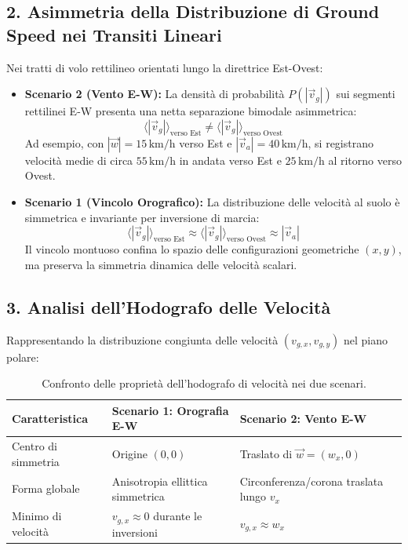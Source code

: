\documentclass[11pt,a4paper]{article}
\begin{document}
\subsection{2. Asimmetria della Distribuzione di Ground Speed nei Transiti Lineari}
Nei tratti di volo rettilineo orientati lungo la direttrice Est-Ovest:
\begin{itemize}
    \item \textbf{Scenario 2 (Vento E-W):} La densit\`a di probabilit\`a $P(|\vec{v}_g|)$ sui segmenti rettilinei E-W presenta una netta separazione bimodale asimmetrica:
    \begin{equation}
        \langle |\vec{v}_g| \rangle_{\text{verso Est}} \neq \langle |\vec{v}_g| \rangle_{\text{verso Ovest}}
    \end{equation}
    Ad esempio, con $|\vec{w}| = 15\,\mathrm{km/h}$ verso Est e $|\vec{v}_a| = 40\,\mathrm{km/h}$, si registrano velocit\`a medie di circa $55\,\mathrm{km/h}$ in andata verso Est e $25\,\mathrm{km/h}$ al ritorno verso Ovest.
    \item \textbf{Scenario 1 (Vincolo Orografico):} La distribuzione delle velocit\`a al suolo \`e simmetrica e invariante per inversione di marcia:
    \begin{equation}
        \langle |\vec{v}_g| \rangle_{\text{verso Est}} \approx \langle |\vec{v}_g| \rangle_{\text{verso Ovest}} \approx |\vec{v}_a|
    \end{equation}
    Il vincolo montuoso confina lo spazio delle configurazioni geometriche $(x, y)$, ma preserva la simmetria dinamica delle velocit\`a scalari.
\end{itemize}

\subsection{3. Analisi dell'Hodografo delle Velocit\`a}
Rappresentando la distribuzione congiunta delle velocit\`a $(v_{g,x}, v_{g,y})$ nel piano polare:

\begin{table}[htbp]
\centering
\begin{tabular}{@{}lll@{}}
\toprule
\textbf{Caratteristica} & \textbf{Scenario 1: Orografia E-W} & \textbf{Scenario 2: Vento E-W} \\ \midrule
Centro di simmetria & Origine $(0,0)$ & Traslato di $\vec{w} = (w_x, 0)$ \\
Forma globale & Anisotropia ellittica simmetrica & Circonferenza/corona traslata lungo $v_x$ \\
Minimo di velocit\`a & $v_{g,x} \approx 0$ durante le inversioni & $v_{g,x} \approx w_x$ \\ \bottomrule
\end{tabular}
\caption{Confronto delle propriet\`a dell'hodografo di velocit\`a nei due scenari.}
\end{table}
\end{document}
